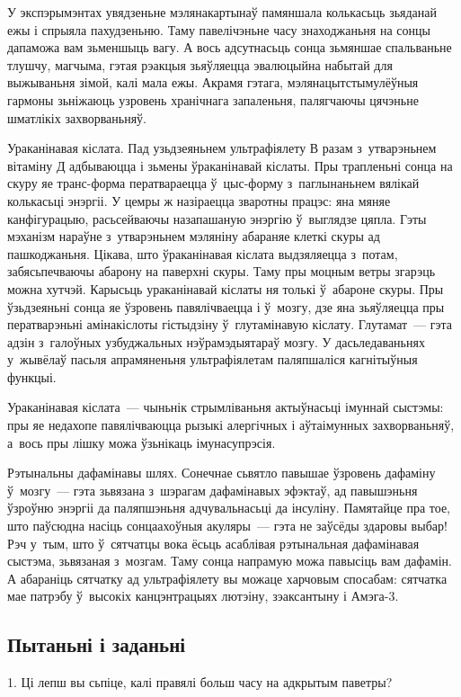 У экспэрымэнтах увядзеньне мэлянакартынаў памяншала колькасьць зьяданай ежы і спрыяла пахудзеньню. Таму павелічэньне часу знаходжаньня на сонцы дапаможа вам зьменшыць вагу. А вось адсутнасьць сонца зьмяншае спальваньне тлушчу, магчыма, гэтая рэакцыя зьяўляецца эвалюцыйна набытай для выжываньня зімой, калі мала ежы. Акрамя гэтага, мэлянацытстымулёўныя гармоны зьніжаюць узровень хранічнага запаленьня, палягчаючы цячэньне шматлікіх захворваньняў. 

Ураканінавая кіслата. Пад узьдзеяньнем ультрафіялету В разам з~утварэньнем вітаміну Д адбываюцца і зьмены ўраканінавай кіслаты. Пры трапленьні сонца на скуру яе транс-форма ператвараецца ў~цыс-форму з~паглынаньнем вялікай колькасьці энэргіі. У цемры ж назіраецца зваротны працэс: яна мяняе канфігурацыю, расьсейваючы назапашаную энэргію ў~выглядзе цяпла. Гэты мэханізм нараўне з~утварэньнем мэляніну абараняе клеткі скуры ад пашкоджаньня. Цікава, што ўраканінавая кіслата выдзяляецца з~потам, забясьпечваючы абарону на паверхні скуры. Таму пры моцным ветры згарэць можна хутчэй. Карысьць ураканінавай кіслаты ня толькі ў~абароне скуры. Пры ўзьдзеяньні сонца яе ўзровень павялічваецца і ў~мозгу, дзе яна зьяўляецца пры ператварэньні амінакіслоты гістыдзіну ў~глутамінавую кіслату. Глутамат~--- гэта адзін з~галоўных узбуджальных нэўрамэдыятараў мозгу. У дасьледаваньнях у~жывёлаў пасьля апрамяненьня ультрафіялетам паляпшаліся кагнітыўныя функцыі. 

Ураканінавая кіслата~--- чыньнік стрымліваньня актыўнасьці імуннай сыстэмы: пры яе недахопе павялічваюцца рызыкі алергічных і аўтаімунных захворваньняў, а~вось пры лішку можа ўзьнікаць імунасупрэсія. 

Рэтынальны дафамінавы шлях. Сонечнае сьвятло павышае ўзровень дафаміну ў~мозгу~--- гэта зьвязана з~шэрагам дафамінавых эфэктаў, ад павышэньня ўзроўню энэргіі да паляпшэньня адчувальнасьці да інсуліну. Памятайце пра тое, што паўсюдна насіць сонцаахоўныя акуляры~--- гэта не заўсёды здаровы выбар! Рэч у~тым, што ў~сятчатцы вока ёсьць асаблівая рэтынальная дафамінавая сыстэма, зьвязаная з~мозгам. Таму сонца напрамую можа павысіць вам дафамін. А абараніць сятчатку ад ультрафіялету вы можаце харчовым спосабам: сятчатка мае патрэбу ў~высокіх канцэнтрацыях лютэіну, зэаксантыну і Амэга-3.

\subsection*{Пытаньні і заданьні}

1. Ці лепш вы сьпіце, калі правялі больш часу на адкрытым паветры?


